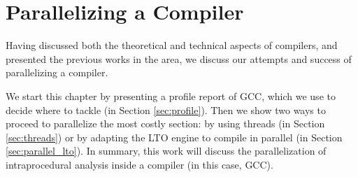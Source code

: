 \chapter{Parallelizing a Compiler}
\label{chap:proposta}

Having discussed both the theoretical and technical aspects of compilers, and
presented the previous works in the area, we discuss our attempts and success
of parallelizing a compiler.

We start this chapter by presenting a profile report of GCC, which we use to
decide where to tackle (in Section \ref{sec:profile}). Then we show two ways to
proceed to parallelize the most costly section: by using threads (in Section
\ref{sec:threads}) or by adapting the LTO engine to compile in parallel (in
Section \ref{sec:parallel_lto}). In summary, this work will discuss the
parallelization of intraprocedural analysis inside a compiler (in this case,
GCC).


